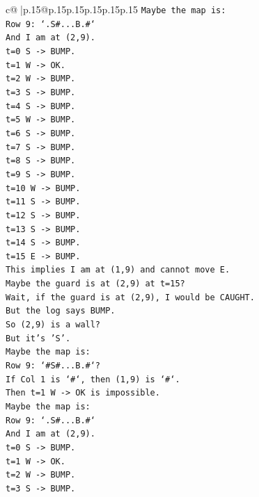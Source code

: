 \documentclass{article}
\begin{document}
{\begin{supertabular}{c@{$\;$}|p{.15\linewidth}@{}p{.15\linewidth}p{.15\linewidth}p{.15\linewidth}p{.15\linewidth}p{.15\linewidth}}
{{{\texttt{Maybe the map is:} \\
\texttt{Row 9: `.S\#...B.\#`} \\
\texttt{And I am at (2,9).} \\
\texttt{t=0 S {-}> BUMP.} \\
\texttt{t=1 W {-}> OK.} \\
\texttt{t=2 W {-}> BUMP.} \\
\texttt{t=3 S {-}> BUMP.} \\
\texttt{t=4 S {-}> BUMP.} \\
\texttt{t=5 W {-}> BUMP.} \\
\texttt{t=6 S {-}> BUMP.} \\
\texttt{t=7 S {-}> BUMP.} \\
\texttt{t=8 S {-}> BUMP.} \\
\texttt{t=9 S {-}> BUMP.} \\
\texttt{t=10 W {-}> BUMP.} \\
\texttt{t=11 S {-}> BUMP.} \\
\texttt{t=12 S {-}> BUMP.} \\
\texttt{t=13 S {-}> BUMP.} \\
\texttt{t=14 S {-}> BUMP.} \\
\texttt{t=15 E {-}> BUMP.} \\
\texttt{This implies I am at (1,9) and cannot move E.} \\
\texttt{Maybe the guard is at (2,9) at t=15?} \\
\texttt{Wait, if the guard is at (2,9), I would be CAUGHT.} \\
\texttt{But the log says BUMP.} \\
\texttt{So (2,9) is a wall?} \\
\texttt{But it's 'S'.} \\
\texttt{Maybe the map is:} \\
\texttt{Row 9: `\#S\#...B.\#`?} \\
\texttt{If Col 1 is `\#`, then (1,9) is `\#`.} \\
\texttt{Then t=1 W {-}> OK is impossible.} \\
\texttt{Maybe the map is:} \\
\texttt{Row 9: `.S\#...B.\#`} \\
\texttt{And I am at (2,9).} \\
\texttt{t=0 S {-}> BUMP.} \\
\texttt{t=1 W {-}> OK.} \\
\texttt{t=2 W {-}> BUMP.} \\
\texttt{t=3 S {-}> BUMP.} \\
}}}
\end{supertabular}}
\end{document}
